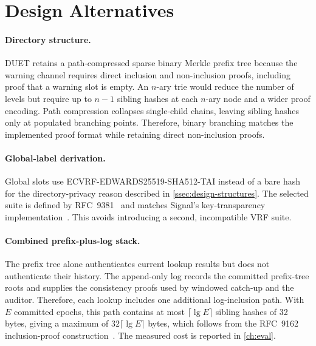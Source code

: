 \section{Design Alternatives}\label{sec:design-detail-alternatives}

\paragraph{Directory structure.} DUET retains a path-compressed sparse binary Merkle prefix tree
because the warning channel requires direct inclusion and non-inclusion proofs, including proof that
a warning slot is empty. An $n$-ary trie would reduce the number of levels but require up to $n-1$
sibling hashes at each $n$-ary node and a wider proof encoding. Path compression collapses
single-child chains, leaving sibling hashes only at populated branching points. Therefore, binary
branching matches the implemented proof format while retaining direct non-inclusion proofs.

\paragraph{Global-label derivation.} Global slots use
ECVRF-EDWARDS25519-SHA512-TAI instead of a bare hash for the directory-privacy reason described in
\cref{ssec:design-structures}. The selected suite is defined by
RFC~9381~\cite[Section~5.5]{rfc9381} and matches Signal's key-transparency implementation~\cite{signal-kt-server}. This avoids introducing a second, incompatible VRF suite.

\paragraph{Combined prefix-plus-log stack.} The prefix tree alone authenticates current lookup
results but does not authenticate their history. The append-only log records the committed
prefix-tree roots and supplies the consistency proofs used by windowed catch-up and the auditor.
Therefore, each lookup includes one additional log-inclusion path. With $E$ committed epochs, this
path contains at most $\lceil\lg E\rceil$ sibling hashes of 32 bytes, giving a maximum of
$32\lceil\lg E\rceil$ bytes, which follows from the RFC~9162 inclusion-proof
construction~\cite[Section~2.1.3]{rfc9162}. The measured cost is reported in
\cref{ch:eval}.
